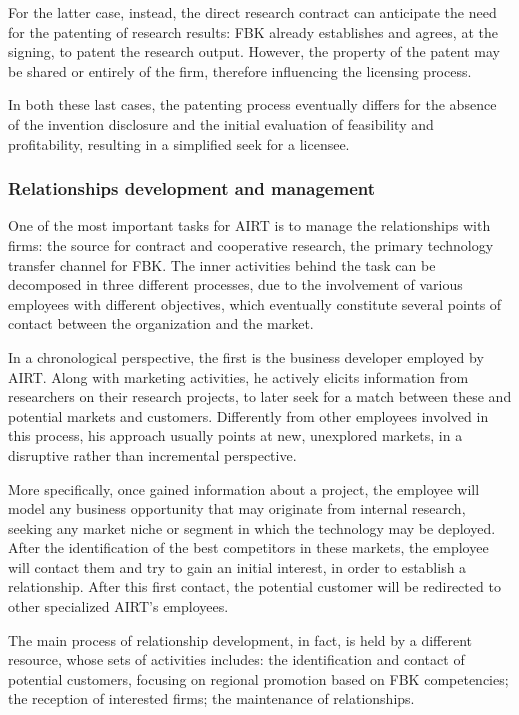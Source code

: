 For the latter case, instead, the direct research contract can anticipate the need for the patenting of research results: FBK already establishes and agrees, at the signing, to patent the research output. However, the property of the patent may be shared or entirely of the firm, therefore influencing the licensing process.

In both these last cases, the patenting process eventually differs for the absence of the invention disclosure and the initial evaluation of feasibility and profitability, resulting in a simplified seek for a licensee.

\subsubsection{Relationships development and management}

One of the most important tasks for AIRT is to manage the relationships with firms: the source for contract and cooperative research, the primary technology transfer channel for FBK. The inner activities behind the task can be decomposed in three different processes, due to the involvement of various employees with different objectives, which eventually constitute several points of contact between the organization and the market.

In a chronological perspective, the first is the business developer employed by AIRT. Along with marketing activities, he actively elicits information from researchers on their research projects, to later seek for a match between these and potential markets and customers. Differently from other employees involved in this process, his approach usually points at new, unexplored markets, in a disruptive rather than incremental perspective. 

More specifically, once gained information about a project, the employee will model any business opportunity that may originate from internal research, seeking any market niche or segment in which the technology may be deployed. After the identification of the best competitors in these markets, the employee will contact them and try to gain an initial interest, in order to establish a relationship. After this first contact, the potential customer will be redirected to other specialized AIRT's employees. 

The main process of relationship development, in fact, is held by a different resource, whose sets of activities includes: the identification and contact of potential customers, focusing on regional promotion based on FBK competencies; the reception of interested firms; the maintenance of relationships. 

